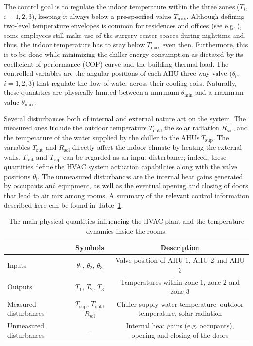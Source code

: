 The control goal is to regulate the indoor temperature within the three zones ($T_i$, $i=1,2,3$), keeping it always below a pre-specified value $T_{\text{max}}$. Although defining two-level temperature envelopes is common for residences and offices (see e.g. \cite{fiorentini2017hybrid,lian2021adaptive}), some employees still make use of the surgery center spaces during nighttime and, thus, the indoor temperature has to stay below $T_{\text{max}}$ even then. Furthermore, this is to be done while minimizing the chiller energy consumption as dictated by its coefficient of performance (COP) curve and the building thermal load. The controlled variables are the angular positions of each AHU three-way valve ($\theta_i$, $i=1,2,3$) that regulate the flow of water across their cooling coils. Naturally, these quantities are physically limited between a minimum $\theta_\text{min}$ and a maximum value $\theta_\text{max}$.

Several disturbances both of internal and external nature act on the system. The measured ones include the outdoor temperature $T_\text{out}$, the solar radiation $R_\text{sol}$, and the temperature of the water supplied by the chiller to the AHUs $T_\text{sup}$. The variables $T_\text{out}$ and $R_\text{sol}$ directly affect the indoor climate by heating the external walls. $T_\text{out}$ and $T_\text{sup}$ can be regarded as an input disturbance; indeed, these quantities define the HVAC system actuation capabilities along with the valve positions $\theta_i$. The unmeasured disturbances are the internal heat gains generated by occupants and equipment, as well as the eventual opening and closing of doors that lead to air mix among rooms. A summary of the relevant control information described here can be found in Table~\ref{tab.controlInformation}.

\begin{table}[!ht]
	\small
	\centering
	\begin{tabular}{l|c|c}
		\hline & Symbols & Description \\\hline
		Inputs & $\theta_\text{1}$, $\theta_\text{2}$, $\theta_\text{3}$ & Valve position of AHU 1, AHU 2 and AHU 3 \\
		Outputs & $T_\text{1}$, $T_\text{2}$, $T_\text{3}$ & Temperatures within zone 1, zone 2 and zone 3 \\
		Measured disturbances & $T_\text{sup}$, $T_\text{out}$, $R_\text{sol}$ & Chiller supply water temperature, outdoor temperature, solar radiation \\
		Unmeasured disturbances & $-$ & Internal heat gains (e.g. occupants), opening and closing of the doors \\
		\hline
	\end{tabular}
	\caption{The main physical quantities influencing the HVAC plant and the temperature dynamics inside the rooms.}
	\label{tab.controlInformation}
\end{table}

